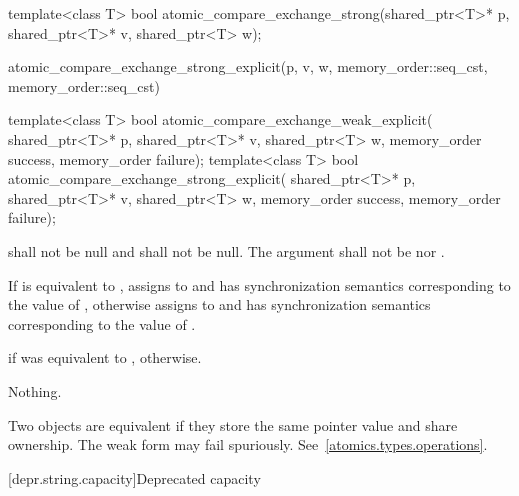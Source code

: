 %
\begin{itemdecl}
template<class T>
  bool atomic_compare_exchange_strong(shared_ptr<T>* p, shared_ptr<T>* v, shared_ptr<T> w);
\end{itemdecl}

\begin{itemdescr}
\pnum
\returns
\begin{codeblock}
atomic_compare_exchange_strong_explicit(p, v, w, memory_order::seq_cst,
                                        memory_order::seq_cst)
\end{codeblock}
\end{itemdescr}

%
%
\begin{itemdecl}
template<class T>
  bool atomic_compare_exchange_weak_explicit(
    shared_ptr<T>* p, shared_ptr<T>* v, shared_ptr<T> w,
    memory_order success, memory_order failure);
template<class T>
  bool atomic_compare_exchange_strong_explicit(
    shared_ptr<T>* p, shared_ptr<T>* v, shared_ptr<T> w,
    memory_order success, memory_order failure);
\end{itemdecl}

\begin{itemdescr}
\pnum
\requires {} shall not be null and  shall not be null.
The  argument shall not be  nor
.

\pnum
\effects
If  is equivalent to , assigns  to
 and has synchronization semantics corresponding to the value of
, otherwise assigns  to  and has
synchronization semantics corresponding to the value of .

\pnum
\returns
{} if  was equivalent to ,  otherwise.

\pnum
\throws
Nothing.

\pnum
\remarks
Two  objects are equivalent if they store the same
pointer value and share ownership.
The weak form may fail spuriously. See~\ref{atomics.types.operations}.
\end{itemdescr}

[depr.string.capacity]{Deprecated  capacity}

